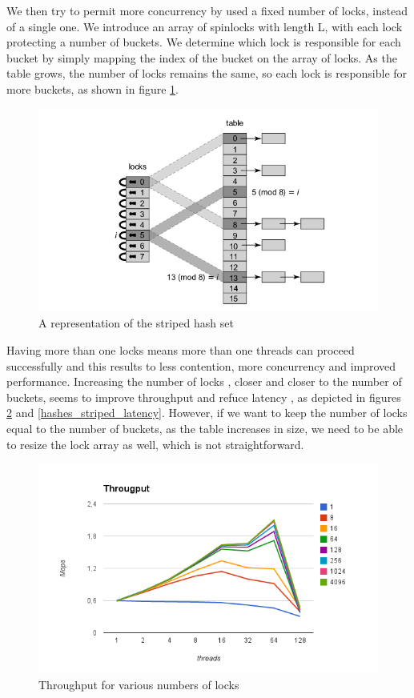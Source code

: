 We then try to permit more concurrency by used a fixed number of locks, instead of a single one. We introduce an array of spinlocks with length L, with each lock protecting a number of buckets. We determine which lock is responsible for each bucket by simply mapping the index of the bucket on the array of locks. As the table grows, the number of locks remains the same, so each lock is responsible for more buckets, as shown in figure \ref{striped_hash_set}.

\begin{figure}
 \centering
  \includegraphics[scale=0.5]{striped_hash_set.png}
\caption{A representation of the striped hash set}
\label{striped_hash_set}
\end{figure}


Having more than one locks means more than one threads can proceed  successfully and this results to less contention, more concurrency and improved performance. Increasing the number of locks , closer and closer to the number of buckets, seems to improve throughput and refuce latency , as depicted in figures \ref{hashes_striped_through} and \ref{hashes_striped_latency}. However, if we want to keep the number of locks equal to the number of buckets, as the table increases in size, we need to be able to resize the lock array as well, which is not straightforward.

\begin{figure}
 \centering
  \includegraphics[scale=0.7]{hashes_striped_through.png}
\caption{Throughput for various numbers of locks}
\label{hashes_striped_through}
\end{figure}

